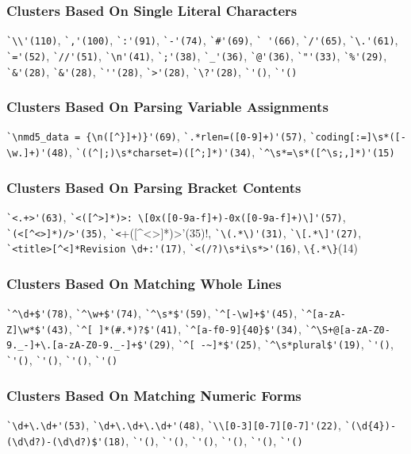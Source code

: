 \subsubsection{Clusters Based On Single Literal Characters}
\verb!`\\'(110)!, \verb!`,'(100)!, \verb!`:'(91)!, \verb!`-'(74)!, \verb!`#'(69)!, \verb!` '(66)!, \verb!`/'(65)!, \verb!`\.'(61)!, \verb!`='(52)!, \verb!`//'(51)!, \verb!`\n'(41)!, \verb!`;'(38)!, \verb!`_'(36)!, \verb!`@'(36)!, \verb!`"'(33)!, \verb!`%'(29)!, \verb!`&'(28)!, \verb!`&'(28)!, \verb!`''(28)!, \verb!`>'(28)!, \verb!`\?'(28)!, \verb!`'()!, \verb!`'()!

\subsubsection{Clusters Based On Parsing Variable Assignments}
\verb!`\nmd5_data = {\n([^}]+)}'(69)!, \verb!`.*rlen=([0-9]+)'(57)!, \verb!`coding[:=]\s*([-\w.]+)'(48)!, \verb!`((^|;)\s*charset=)([^;]*)'(34)!, \verb!`^\s*=\s*([^\s;,]*)'(15)!

\subsubsection{Clusters Based On Parsing Bracket Contents}
\verb!`<.+>'(63)!, \verb!`<([^>]*)>: \[0x([0-9a-f]+)-0x([0-9a-f]+)\]'(57)!, \verb!`(<[^<>]*)/>'(35)!, \verb!`<!\s+([^<>]*)>'(35)!,  \verb!`\(.*\)'(31)!, \verb!`\[.*\]'(27)!, \verb!`<title>[^<]*Revision \d+:'(17)!, \verb!`<(/?)\s*i\s*>'(16)!, \verb!\{.*\}!(14)

\subsubsection{Clusters Based On Matching Whole Lines}
\verb!`^\d+$'(78)!, \verb!`^\w+$'(74)!, \verb!`^\s*$'(59)!, \verb!`^[-\w]+$'(45)!, \verb!`^[a-zA-Z]\w*$'(43)!, \verb!`^[ ]*(#.*)?$'(41)!, \verb!`^[a-f0-9]{40}$'(34)!, \verb!`^\S+@[a-zA-Z0-9._-]+\.[a-zA-Z0-9._-]+$'(29)!, \verb!`^[ -~]*$'(25)!, \verb!`^\s*plural$'(19)!, \verb!`'()!, \verb!`'()!, \verb!`'()!, \verb!`'()!, \verb!`'()!

\subsubsection{Clusters Based On Matching Numeric Forms}
\verb!`\d+\.\d+'(53)!, \verb!`\d+\.\d+\.\d+'(48)!, \verb!`\\[0-3][0-7][0-7]'(22)!, \verb!`(\d{4})-(\d\d?)-(\d\d?)$'(18)!, \verb!`'()!, \verb!`'()!, \verb!`'()!, \verb!`'()!, \verb!`'()!, \verb!`'()!

